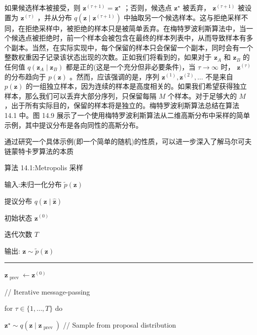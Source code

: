 \documentclass[10pt]{article}
\newcommand{\HRule}{\begin{center}\rule{0.9\linewidth}{0.2mm}\end{center}}
\begin{document}
如果候选样本被接受，则 \({\mathbf{z}}^{\left( \tau  + 1\right) } = {\mathbf{z}}^{ \star  }\) ；否则，候选点 \({\mathbf{z}}^{ \star  }\) 被丢弃， \({\mathbf{z}}^{\left( \tau  + 1\right) }\) 被设置为 \({\mathbf{z}}^{\left( \tau \right) }\) ，并从分布 \(q\left( {\mathbf{z} \mid  {\mathbf{z}}^{\left( \tau  + 1\right) }}\right)\) 中抽取另一个候选样本。这与拒绝采样不同，在拒绝采样中，被拒绝的样本只是被简单丢弃。在梅特罗波利斯算法中，当一个候选点被拒绝时，前一个样本会被包含在最终的样本列表中，从而导致样本有多个副本。当然，在实际实现中，每个保留的样本只会保留一个副本，同时会有一个整数权重因子记录该状态出现的次数。正如我们将看到的，如果对于 \({\mathbf{z}}_{A}\) 和 \({\mathbf{z}}_{B}\) 的任何值 \(q\left( {{\mathbf{z}}_{A} \mid  {\mathbf{z}}_{B}}\right)\) 都是正的(这是一个充分但非必要条件)，当 \(\tau  \rightarrow  \infty\) 时， \({\mathbf{z}}^{\left( \tau \right) }\) 的分布趋向于 \(p\left( \mathbf{z}\right)\) 。然而，应该强调的是，序列 \({\mathbf{z}}^{\left( 1\right) },{\mathbf{z}}^{\left( 2\right) },\ldots\) 不是来自 \(p\left( \mathbf{z}\right)\) 的一组独立样本，因为连续的样本是高度相关的。如果我们希望获得独立样本，那么我们可以丢弃大部分序列，只保留每隔 \(M\) 个样本。对于足够大的 \(M\) ，出于所有实际目的，保留的样本将是独立的。梅特罗波利斯算法总结在算法 14.1 中。图 14.9 展示了一个使用梅特罗波利斯算法从二维高斯分布中采样的简单示例，其中提议分布是各向同性的高斯分布。

通过研究一个具体示例(即一个简单的随机)的性质，可以进一步深入了解马尔可夫链蒙特卡罗算法的本质

算法 14.1:Metropolis 采样

输入:未归一化分布 \(\widetilde{p}\left( \mathbf{z}\right)\)

提议分布 \(q\left( {\mathbf{z} \mid  \widehat{\mathbf{z}}}\right)\)

初始状态 \({\mathbf{z}}^{\left( 0\right) }\)

迭代次数 \(T\)

输出: \(\mathbf{z} \sim  \widetilde{p}\left( \mathbf{z}\right)\)

\HRule

\({\mathbf{z}}_{\text{ prev }} \leftarrow  {\mathbf{z}}^{\left( 0\right) }\)

// Iterative message-passing

for \(\tau  \in  \{ 1,\ldots ,T\}\) do

\hspace*{1em} \({\mathbf{z}}^{ \star  } \sim  q\left( {\mathbf{z} \mid  {\mathbf{z}}_{\text{ prev }}}\right)\) // Sample from proposal distribution
\end{document}
